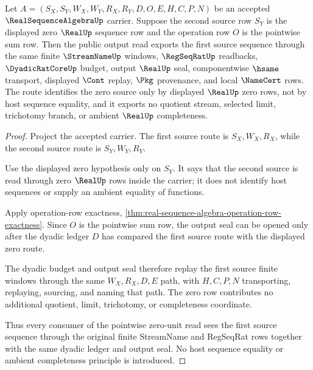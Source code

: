 \begin{theorem}
\label{thm:real-sequence-algebra-pointwise-zero-unit}
Let $A=(S_X,S_Y,W_X,W_Y,R_X,R_Y,D,O,E,H,C,P,N)$ be an accepted $\RealSequenceAlgebraUp$ carrier. Suppose the second source row $S_Y$ is the displayed zero $\RealUp$ sequence row and the operation row $O$ is the pointwise sum row. Then the public output read exports the first source sequence through the same finite $\StreamNameUp$ windows, $\RegSeqRatUp$ readbacks, $\DyadicRatCoreUp$ budget, output $\RealUp$ seal, componentwise $\hsame$ transport, displayed $\Cont$ replay, $\Pkg$ provenance, and local $\NameCert$ rows. The route identifies the zero source only by displayed $\RealUp$ zero rows, not by host sequence equality, and it exports no quotient stream, selected limit, trichotomy branch, or ambient $\RealUp$ completeness.
\end{theorem}
\begin{proof}
Project the accepted carrier. The first source route is $S_X,W_X,R_X$, while the second source route is $S_Y,W_Y,R_Y$.

Use the displayed zero hypothesis only on $S_Y$. It says that the second source is read through zero $\RealUp$ rows inside the carrier; it does not identify host sequences or supply an ambient equality of functions.

Apply operation-row exactness, \autoref{thm:real-sequence-algebra-operation-row-exactness}. Since $O$ is the pointwise sum row, the output seal can be opened only after the dyadic ledger $D$ has compared the first source route with the displayed zero route.

The dyadic budget and output seal therefore replay the first source finite windows through the same $W_X,R_X,D,E$ path, with $H,C,P,N$ transporting, replaying, sourcing, and naming that path. The zero row contributes no additional quotient, limit, trichotomy, or completeness coordinate.

Thus every consumer of the pointwise zero-unit read sees the first source sequence through the original finite StreamName and RegSeqRat rows together with the same dyadic ledger and output seal. No host sequence equality or ambient completeness principle is introduced.
\end{proof}


